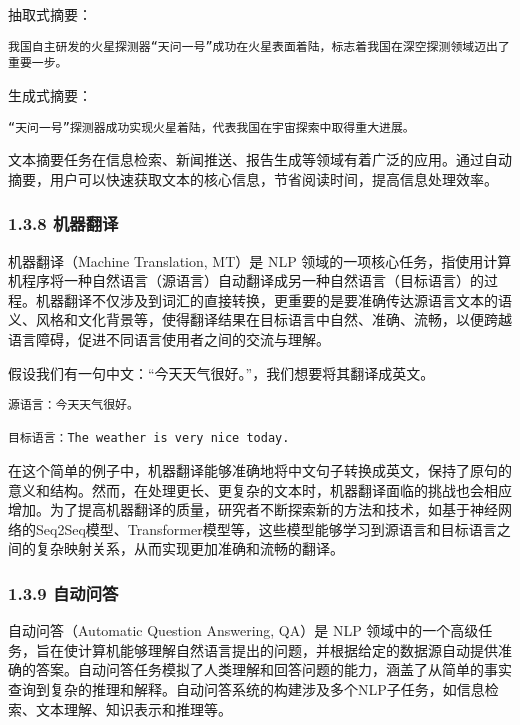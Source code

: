 \documentclass[12pt,a4paper]{book}
\begin{document}
抽取式摘要：

\begin{verbatim}
我国自主研发的火星探测器“天问一号”成功在火星表面着陆，标志着我国在深空探测领域迈出了重要一步。
\end{verbatim}

生成式摘要：

\begin{verbatim}
“天问一号”探测器成功实现火星着陆，代表我国在宇宙探索中取得重大进展。
\end{verbatim}

文本摘要任务在信息检索、新闻推送、报告生成等领域有着广泛的应用。通过自动摘要，用户可以快速获取文本的核心信息，节省阅读时间，提高信息处理效率。

\subsubsection{1.3.8 机器翻译}\label{ux673aux5668ux7ffbux8bd1}

机器翻译（Machine Translation, MT）是 NLP
领域的一项核心任务，指使用计算机程序将一种自然语言（源语言）自动翻译成另一种自然语言（目标语言）的过程。机器翻译不仅涉及到词汇的直接转换，更重要的是要准确传达源语言文本的语义、风格和文化背景等，使得翻译结果在目标语言中自然、准确、流畅，以便跨越语言障碍，促进不同语言使用者之间的交流与理解。

假设我们有一句中文：``今天天气很好。''，我们想要将其翻译成英文。

\begin{verbatim}
源语言：今天天气很好。

目标语言：The weather is very nice today.
\end{verbatim}

在这个简单的例子中，机器翻译能够准确地将中文句子转换成英文，保持了原句的意义和结构。然而，在处理更长、更复杂的文本时，机器翻译面临的挑战也会相应增加。为了提高机器翻译的质量，研究者不断探索新的方法和技术，如基于神经网络的Seq2Seq模型、Transformer模型等，这些模型能够学习到源语言和目标语言之间的复杂映射关系，从而实现更加准确和流畅的翻译。

\subsubsection{1.3.9 自动问答}\label{ux81eaux52a8ux95eeux7b54}

自动问答（Automatic Question Answering, QA）是 NLP
领域中的一个高级任务，旨在使计算机能够理解自然语言提出的问题，并根据给定的数据源自动提供准确的答案。自动问答任务模拟了人类理解和回答问题的能力，涵盖了从简单的事实查询到复杂的推理和解释。自动问答系统的构建涉及多个NLP子任务，如信息检索、文本理解、知识表示和推理等。
\end{document}
